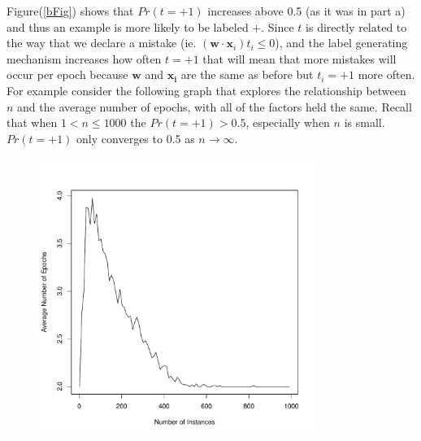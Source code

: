 \documentclass{article}
\begin{document}
Figure(\ref{bFig}) shows that $Pr(t=+1)$ increases above 0.5 (as it was in part a) and thus an example is more likely to be labeled $+$. 
Since $t$ is directly related to the way that we declare a mistake (ie. $(\bm{w\cdot x}_i) t_i \le0$), and the label generating mechanism increases how often $t=+1$ that will mean that more mistakes will occur per epoch because $\bm{w}$ and $\bm{x_i}$ are the same as before but $t_i=+1$ more often. %
For example consider the following graph that explores the relationship between $n$ and the average number of epochs, with all of the factors held the same.
Recall that when $1<n\le1000$ the $Pr(t=+1)>0.5$, especially when $n$ is small.
$Pr(t=+1)$ only converges to 0.5 as $n\rightarrow\infty$.

\begin{figure}[h!]
\centering
\includegraphics[width=0.8\textwidth]{epochsB.pdf}
\label{epoch}
\end{figure}
\end{document}
